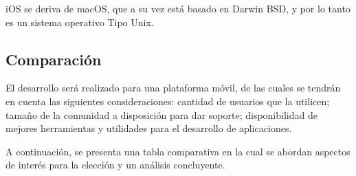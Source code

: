             \par iOS se deriva de macOS, que a su vez está basado en Darwin BSD, y por lo tanto es un sistema operativo Tipo Unix.
            
  
            
            
    \subsection{Comparación}
        \par El desarrollo será realizado para una plataforma móvil, de las cuales se tendrán en cuenta las siguientes consideraciones: cantidad de usuarios que la utilicen; tamaño de la comunidad a disposición para dar soporte; disponibilidad de mejores herramientas y utilidades para el desarrollo de aplicaciones.
        
        \par A continuación, se presenta una tabla comparativa en la cual se abordan aspectos de interés para la elección y un análisis concluyente.
        

